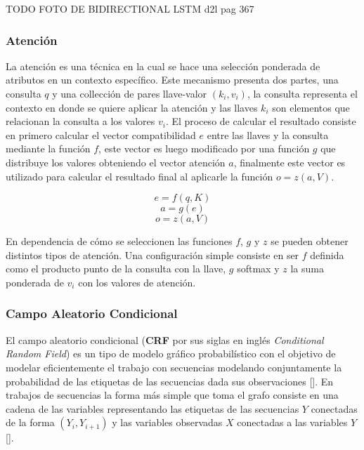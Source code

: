 TODO FOTO DE BIDIRECTIONAL LSTM d2l pag 367

\subsubsection{Atención}

La atención es una técnica en la cual se hace una selección ponderada de atributos en un contexto específico. 
Este mecanismo presenta dos partes, una consulta $q$ y una collección de pares llave-valor $(k_i, v_i)$, la 
consulta representa el contexto en donde se quiere aplicar la atención y las llaves $k_i$ son elementos que 
relacionan la consulta a los valores $v_i$. El proceso de calcular el resultado consiste en primero calcular 
el vector compatibilidad $e$ entre las llaves y la consulta mediante la función $f$, este vector es luego 
modificado por una función $g$ que distribuye los valores obteniendo el vector atención $a$, finalmente 
este vector es utilizado para calcular el resultado final al aplicarle la función $o = z(a, V)$.

\begin{equation}
	e = f(q, K)
\end{equation}
\begin{equation}
	a = g(e)
\end{equation}
\begin{equation}
	o = z(a, V)
\end{equation}

En dependencia de cómo se seleccionen las funciones $f$, $g$ y $z$ se pueden obtener distintos tipos de atención.
Una configuración simple consiste en ser $f$ definida como el producto punto de la consulta con la llave,
$g$ softmax y $z$ la suma ponderada de $v_i$ con los valores de atención. 

\subsubsection{Campo Aleatorio Condicional}


El campo aleatorio condicional (\textbf{CRF} por sus siglas en inglés \emph{Conditional Random Field}) es un 
tipo de modelo gráfico probabilístico con el objetivo de modelar eficientemente el trabajo con secuencias 
modelando conjuntamente la probabilidad de las etiquetas de las secuencias dada sus observaciones [\cite{lafferty2001conditional}].
En trabajos de secuencias la forma más simple que toma el grafo consiste en una cadena de las variables representando
las etiquetas de las secuencias $Y$ conectadas de la forma $(Y_i, Y_{i+1})$ y las variables observadas $X$ conectadas
a las variables $Y$ [\cite{wallach2004conditional}].

